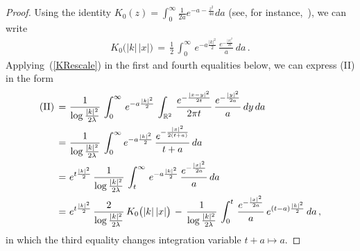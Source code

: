 \documentclass[10pt]{article}
\numberwithin{equation}{section}
\theoremstyle{definition}
\newcommand{\R}{{\mathbb R}}
\begin{document}
\begin{appendix}
\begin{proof}
 Using the identity $ K_0(z)=\int_0^{\infty}\frac{1}{2a}e^{-a-\frac{z^2}{4a} }da $ (see, for instance,~\cite[p.\ 183]{Watson}), we can write
 \begin{align}\label{KRescale}
       K_0\big(|k|\,|x| \big)\,=\,\frac{1}{2}\,\int_0^{\infty}\,e^{-a\frac{|k|^2}{2}  }\,\frac{ e^{ -\frac{|x|^2}{2a}  }  }{ a }\,da \,.
 \end{align}
 Applying~(\ref{KRescale}) in the first and fourth equalities below, we can express (II) in the form
\begin{align} \label{ForII} 
\textup{(II)}\,=\, &\,\frac{ 1  }{\log \frac{|k|^2}{2\lambda}   } \,\int_0^{\infty}\,e^{-a\frac{|k|^2}{2}  }\,
\int_{\R^2}\,\frac{e^{ -\frac{ |x-y|^2  }{ 2t }  }
 }{ 2\pi t}\,\frac{e^{-\frac{ |y|^2  }{ 2a } }  }{ a }\,dy \, da  \nonumber  \\
\,=\, &\,\frac{ 1 }{\log \frac{|k|^2}{2\lambda}   } \,\int_0^{\infty}e^{-a\frac{|k|^2}{2}  }\,
\frac{e^{-\frac{ |x|^2  }{ 2(t+a) } }  }{ t+a } \, da  \nonumber \\
\,=\, &\,e^{t\frac{|k|^2}{2} } \,\frac{ 1  }{\log \frac{|k|^2}{2\lambda}   } \,\int_t^{\infty}\,e^{-a\frac{|k|^2}{2}  }\,
\frac{e^{-\frac{ |x|^2  }{ 2a } }  }{ a }  \,da  \nonumber 
\\
\,=\, &\,e^{t\frac{|k|^2}{2} }\,\frac{2  }{\log \frac{|k|^2}{2\lambda}   }\, K_0\big(|k|\,|x|\big)\,-\, \frac{ 1  }{\log \frac{|k|^2}{2\lambda}   }\, \int_0^{t}\,
\frac{e^{-\frac{ |x|^2  }{ 2a } }  }{ a } \, e^{(t-a)\frac{|k|^2}{2}  }\, da\,,  
\end{align}
in which the third equality changes integration variable $t+a\mapsto a$.


\end{proof}
\end{appendix}
\end{document}
